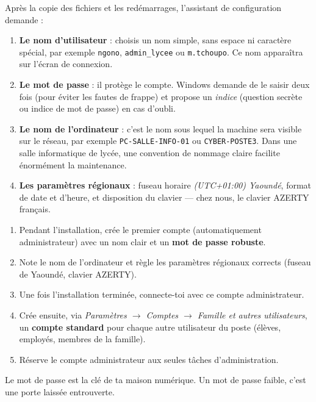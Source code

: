 \documentclass[11pt]{article}
\newcommand{\cle}[1]{{\popxbold\color{popdark}#1}}
\newcounter{popsec}
\newcounter{popsub}
\newcommand{\courssub}[1]{%
  \stepcounter{popsub}%
  \par\vspace{9pt}\noindent{\popxbold\fontsize{11.5}{13}\selectfont\color{popink}{\color{poporange}\thepopsec.\thepopsub}\hspace{6pt}#1}\par\nopagebreak\vspace{4pt}
}
\begin{document}
Après la copie des fichiers et les redémarrages, l'assistant de configuration demande :

\begin{enumerate}
  \item \textbf{Le nom d'utilisateur} : choisis un nom simple, sans espace ni caractère spécial, par exemple \texttt{ngono}, \texttt{admin\_lycee} ou \texttt{m.tchoupo}. Ce nom apparaîtra sur l'écran de connexion.
  \item \textbf{Le mot de passe} : il protège le compte. Windows demande de le saisir deux fois (pour éviter les fautes de frappe) et propose un \emph{indice} (question secrète ou indice de mot de passe) en cas d'oubli.
  \item \textbf{Le nom de l'ordinateur} : c'est le nom sous lequel la machine sera visible sur le réseau, par exemple \texttt{PC-SALLE-INFO-01} ou \texttt{CYBER-POSTE3}. Dans une salle informatique de lycée, une convention de nommage claire facilite énormément la maintenance.
  \item \textbf{Les paramètres régionaux} : fuseau horaire \emph{(UTC+01:00) Yaoundé}, format de date et d'heure, et disposition du clavier — chez nous, le clavier \cle{AZERTY} français.
\end{enumerate}

\begin{methode}
\begin{enumerate}
  \item Pendant l'installation, crée le premier compte (automatiquement administrateur) avec un nom clair et un \textbf{mot de passe robuste}.
  \item Note le nom de l'ordinateur et règle les paramètres régionaux corrects (fuseau de Yaoundé, clavier AZERTY).
  \item Une fois l'installation terminée, connecte-toi avec ce compte administrateur.
  \item Crée ensuite, via \emph{Paramètres $\rightarrow$ Comptes $\rightarrow$ Famille et autres utilisateurs}, un \textbf{compte standard} pour chaque autre utilisateur du poste (élèves, employés, membres de la famille).
  \item Réserve le compte administrateur aux seules tâches d'administration.
\end{enumerate}
\end{methode}

\courssub{Les règles d'un bon mot de passe}

Le mot de passe est la clé de ta maison numérique. Un mot de passe faible, c'est une porte laissée entrouverte.
\end{document}
